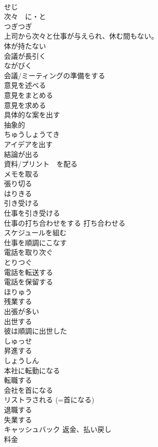 \documentclass[8pt]{extreport}
\begin{document}
\begin{CJK}{UTF8}{min}
\\	せじ
\\	次々　に・と	
\\	つぎつぎ
\\	上司から次々と仕事が与えられ、休む間もない。	
\\	体が持たない	
\\	会議が長引く	
\\	ながびく
\\	会議/ミーティングの準備をする	
\\	意見を述べる	
\\	意見をまとめる	
\\	意見を求める	
\\	具体的な案を出す 
\\	抽象的	
\\	ちゅうしょうてき 
\\	アイデアを出す	
\\	結論が出る	
\\	資料/プリント　を配る	
\\	メモを取る	
\\	張り切る	
\\	はりきる
\\	引き受ける 
\\	仕事を引き受ける	
\\	仕事の打ち合わせをする 打ち合わせる	
\\	スケジュールを組む	
\\	仕事を順調にこなす	
\\	電話を取り次ぐ	
\\	とりつぐ
\\	電話を転送する	
\\	電話を保留する	
\\	ほりゅう
\\	残業する	
\\	出張が多い	
\\	出世する	
\\	彼は順調に出世した 
\\	しゅっせ
\\	昇進する	
\\	しょうしん
\\	本社に転勤になる	
\\	転職する	
\\	会社を首になる	
\\	リストラされる	(=首になる) 
\\	退職する	
\\	失業する	
\\	キャッシュバック	返金、払い戻し 
\\	料金	

\end{CJK}
\end{document}
